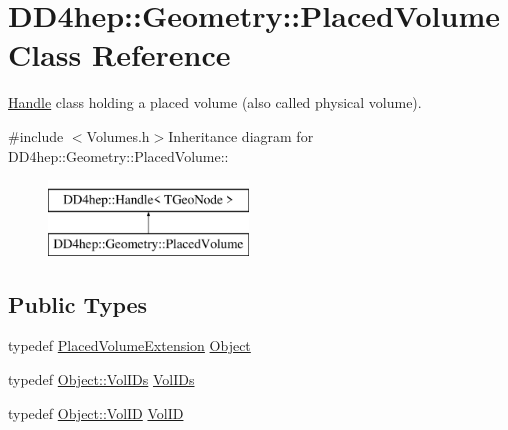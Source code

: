\hypertarget{class_d_d4hep_1_1_geometry_1_1_placed_volume}{
\section{DD4hep::Geometry::PlacedVolume Class Reference}
\label{class_d_d4hep_1_1_geometry_1_1_placed_volume}
}


\hyperlink{class_d_d4hep_1_1_handle}{Handle} class holding a placed volume (also called physical volume).  


{\ttfamily \#include $<$Volumes.h$>$}Inheritance diagram for DD4hep::Geometry::PlacedVolume::\begin{figure}[H]
\begin{center}
\leavevmode
\includegraphics[height=2cm]{class_d_d4hep_1_1_geometry_1_1_placed_volume}
\end{center}
\end{figure}
\subsection*{Public Types}
\begin{DoxyCompactItemize}
\item 
typedef \hyperlink{class_d_d4hep_1_1_geometry_1_1_placed_volume_extension}{PlacedVolumeExtension} \hyperlink{class_d_d4hep_1_1_geometry_1_1_placed_volume_a9ae505098ca6976164b959e1d8b4bbb0}{Object}
\item 
typedef \hyperlink{class_d_d4hep_1_1_geometry_1_1_placed_volume_extension_1_1_vol_i_ds}{Object::VolIDs} \hyperlink{class_d_d4hep_1_1_geometry_1_1_placed_volume_a4383991fbc94adc2997ef98c9d30d9a6}{VolIDs}
\item 
typedef \hyperlink{class_d_d4hep_1_1_geometry_1_1_placed_volume_extension_a9f0e95dedfbda206b118af985b2ed473}{Object::VolID} \hyperlink{class_d_d4hep_1_1_geometry_1_1_placed_volume_aaecde4f8feb863af7cd36c1213bfabe4}{VolID}
\end{DoxyCompactItemize}
